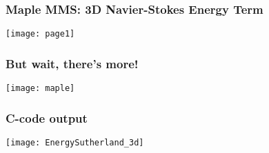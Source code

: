 \documentclass[mathserif]{beamer}
\begin{document}
\begin{frame}
  \frametitle{Maple MMS: 3D Navier-Stokes Energy Term}

  \begin{center}
    \texttt{[image: page1]}  
  \end{center}

\end{frame}
\begin{frame}
  \frametitle{But wait, there's more!}

   \begin{center}
     \texttt{[image: maple]}
   \end{center}

\end{frame}


\begin{frame}
  \frametitle{C-code output}
  \center
  \vspace{-15pt}
  \hspace{-1cm}\quad
  \texttt{[image: EnergySutherland\_3d]}  
\end{frame}

\end{document}
